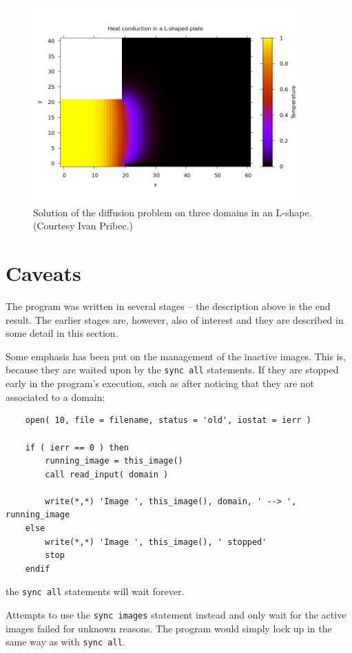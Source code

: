 \documentclass[onecolumn]{article}
\begin{document}
\begin{figure}[H]
\caption{Solution of the diffusion problem on three domains in an L-shape. (Courtesy Ivan Pribec.)}
\label{domains}
\begin{center}
\includegraphics[width=0.9\textwidth]{report_corner.png}
\end{center}
\end{figure}


\section{Caveats}
The program was written in several stages -- the description above is the end result. The earlier stages are, however, also of interest and
they are described in some detail in this section.

Some emphasis has been put on the management of the inactive images. This is, because they are waited upon by the \verb+sync all+ statements.
If they are stopped early in the program's execution, such as after noticing that they are not associated to a domain:
\begin{lstlisting}
    open( 10, file = filename, status = 'old', iostat = ierr )

    if ( ierr == 0 ) then
        running_image = this_image()
        call read_input( domain )

        write(*,*) 'Image ', this_image(), domain, ' --> ', running_image
    else
        write(*,*) 'Image ', this_image(), ' stopped'
        stop
    endif
\end{lstlisting}
\noindent the \verb+sync all+ statements will wait forever.

Attempts to use the \verb+sync images+ statement instead and only wait for the active images failed for unknown reasons. The program would
simply lock up in the same way as with \verb+sync all+.
\end{document}
